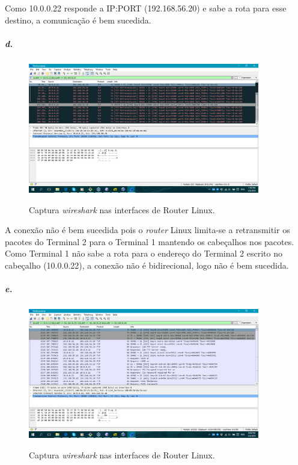 Como \textsf{10.0.0.22} responde a \textsf{IP:PORT} (\textsf{192.168.56.20}) 
e sabe a rota para esse destino, a comunicação é bem sucedida.


\subparagraph{d.}

\begin{figure}[h]
\centering
\includegraphics[width=0.9\textwidth, height=0.3\textheight]{5d.png}
\label{fig:5d}
\caption{Captura \emph{wireshark} nas interfaces de \textsf{Router Linux}.}
\end{figure}

A conexão não é bem sucedida pois o \textsf{\emph{router} Linux} limita-se 
a retransmitir os pacotes do \textsf{Terminal 2} para o \textsf{Terminal 1} 
mantendo os cabeçalhos nos pacotes. Como \textsf{Terminal 1} não sabe a rota 
para o endereço do \textsf{Terminal 2} escrito no cabeçalho (\textsf{10.0.0.22}), 
a conexão não é bidirecional, logo não é bem sucedida.

\subparagraph{e.}

\begin{figure}[h]
\centering
\includegraphics[width=0.9\textwidth, height=0.3\textheight]{5e.png}
\label{fig:5e}
\caption{Captura \emph{wireshark} nas interfaces de \textsf{Router Linux}.}
\end{figure}

